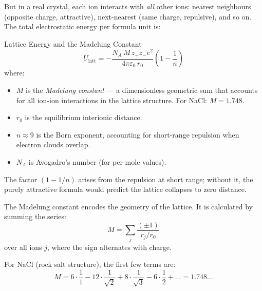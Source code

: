 \documentclass[12pt, a4paper]{book}
\newcommand{\newterm}[1]{\textit{\textcolor{DiscoveryColor}{#1}}}
\begin{document}
But in a real crystal, each ion interacts with \emph{all}
other ions: nearest neighbours (opposite charge, attractive),
next-nearest (same charge, repulsive), and so on.
The total electrostatic energy per formula unit is:

\begin{namedconcept}{Lattice Energy and the Madelung Constant}
\[
  U_\text{latt} = -\frac{N_A\, M\, z_+ z_- e^2}{4\pi\varepsilon_0\, r_0}
  \left(1 - \frac{1}{n}\right)
\]
where:
\begin{itemize}[nosep, leftmargin=2em]
  \item $M$ is the \newterm{Madelung constant} --- a dimensionless
        geometric sum that accounts for all ion-ion interactions
        in the lattice structure. For NaCl: $M = 1.748$.
  \item $r_0$ is the equilibrium interionic distance.
  \item $n \approx 9$ is the Born exponent, accounting for
        short-range repulsion when electron clouds overlap.
  \item $N_A$ is Avogadro's number (for per-mole values).
\end{itemize}

The factor $(1 - 1/n)$ arises from the repulsion at
short range; without it, the purely attractive formula
would predict the lattice collapses to zero distance.
\end{namedconcept}

\vspace{0.5em}

The Madelung constant encodes the geometry of the lattice.
It is calculated by summing the series:
\[
  M = \sum_j \frac{(\pm 1)}{r_j / r_0}
\]
over all ions $j$, where the sign alternates with charge.

For NaCl (rock salt structure), the first few terms are:
\[
  M = 6\cdot\frac{1}{1} - 12\cdot\frac{1}{\sqrt{2}}
      + 8\cdot\frac{1}{\sqrt{3}} - 6\cdot\frac{1}{2}
      + \ldots = 1.748\ldots
\]
\end{document}
